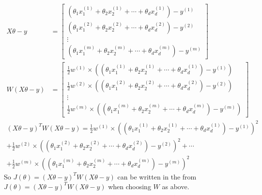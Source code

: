 \documentclass{article}
\begin{document}
\begin{itemize}
\begin{align*}
    X\theta - y &= \begin{bmatrix}
    (\theta_{1}x_{1}^{(1)} + \theta_{2}x_{2}^{(1)} + \cdots + \theta_{d}x_{d}^{(1)})-y^{(1)}\\
    (\theta_{1}x_{1}^{(2)} + \theta_{2}x_{2}^{(2)} + \cdots + \theta_{d}x_{d}^{(2)})-y^{(2)}\\
    \vdots\\
    (\theta_{1}x_{1}^{(m)} + \theta_{2}x_{2}^{(m)} + \cdots + \theta_{d}x_{d}^{(m)})-y^{(m)}
    \end{bmatrix}\\
    W(X\theta - y) &= \begin{bmatrix}
    \frac{1}{2}w^{(1)}\times((\theta_{1}x_{1}^{(1)} + \theta_{2}x_{2}^{(1)} + \cdots + \theta_{d}x_{d}^{(1)})-y^{(1)})\\
    \frac{1}{2}w^{(2)}\times((\theta_{1}x_{1}^{(2)} + \theta_{2}x_{2}^{(2)} + \cdots + \theta_{d}x_{d}^{(2)})-y^{(2)})\\
    \vdots\\
    \frac{1}{2}w^{(m)}\times((\theta_{1}x_{1}^{(m)} + \theta_{2}x_{2}^{(m)} + \cdots + \theta_{d}x_{d}^{(m)})-y^{(m)})
    \end{bmatrix}
\end{align*}
\begin{align*}
    (X\theta - y) ^ {T} W(X\theta - y)=
    \frac{1}{2}w^{(1)}\times((\theta_{1}x_{1}^{(1)} + \theta_{2}x_{2}^{(1)} + \cdots + \theta_{d}x_{d}^{(1)})-y^{(1)})^2\\
    +\frac{1}{2}w^{(2)}\times((\theta_{1}x_{1}^{(2)} + \theta_{2}x_{2}^{(2)} + \cdots + \theta_{d}x_{d}^{(2)})-y^{(2)})^2+\cdots\\
    +\frac{1}{2}w^{(m)}\times((\theta_{1}x_{1}^{(m)} + \theta_{2}x_{2}^{(m)} + \cdots + \theta_{d}x_{d}^{(m)})-y^{(m)})^2
\end{align*}
So $J(\theta) = (X \theta - y)^{T}W(X\theta - y)$ can be written in the from $J(\theta) = (X \theta - y)^{T}W(X\theta - y)$ when choosing $W$ as above.


\end{itemize}
\end{document}
